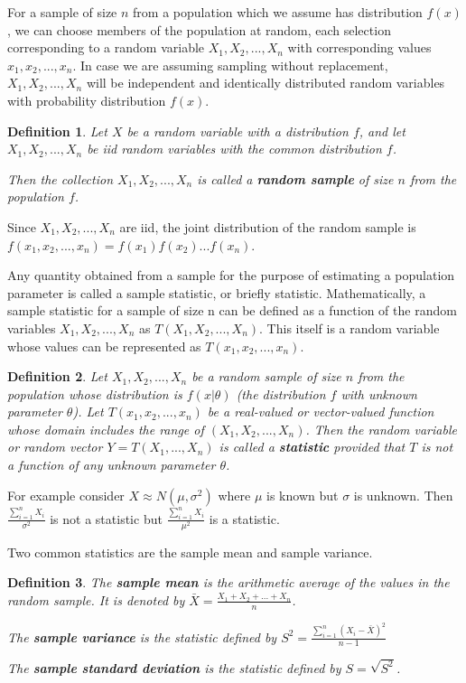 \documentclass[12pt,twoside]{report}
\theoremstyle{thmstyle}
\newtheorem{defn}{Definition}
\begin{document}
For a sample of size $n$ from a population which we assume has distribution $f(x)$, we can choose members of the population at random, each selection corresponding to a random variable $X_1, X_2, ..., X_n$ with corresponding values $x_1, x_2, ..., x_n$. In case we are assuming sampling without replacement, $X_1, X_2, ..., X_n$ will be independent and identically distributed random variables with probability distribution $f(x)$.

\begin{defn}
Let $X$ be a random variable with a distribution $f$, and let $X_1, X_2, ..., X_n$ be iid random variables with the common distribution $f$.

Then the collection $X_1, X_2, ..., X_n$ is called a \textbf{random sample} of size $n$ from the population $f$.
\end{defn}

Since $X_1, X_2, ..., X_n$ are iid, the joint distribution of the random sample is \\
$f(x_1, x_2, ..., x_n) = f(x_1) f(x_2) ... f(x_n)$.

Any quantity obtained from a sample for the purpose of estimating a population parameter is called a sample
statistic, or briefly statistic. Mathematically, a sample statistic for a sample of size n can be defined as a function of the random variables $X_1, X_2, ..., X_n$ as $T(X_1, X_2, ..., X_n)$. This itself is a random variable whose values can be represented as $T(x_1, x_2, ..., x_n)$.

\begin{defn}
    Let $X_1, X_2, ..., X_n$ be a random sample of size $n$ from the population whose distribution is $f\left (x|\theta\right )$ (the distribution $f$ with unknown parameter $\theta$). Let $T\left (x_1, x_2, ...,x_n\right )$ be a real-valued or vector-valued function whose domain includes the range of $\left (X_1, X_2, ..., X_n\right )$. Then the random variable or random vector $Y = T\left (X_1, ..., X_n\right )$ is called a \textbf{statistic} provided that $T$ is not a function of any unknown parameter $\theta$.
\end{defn}

For example consider $X \approx N(\mu, \sigma^2)$ where $\mu$ is known but $\sigma$ is unknown. Then $\frac{\sum_{i=1}^n X_i}{\sigma^2}$ is not a statistic but $\frac{\sum_{i=1}^n X_i}{\mu^2}$ is a statistic.

Two common statistics are the sample mean and sample variance.

\begin{defn}
    The \textbf{sample mean} is the arithmetic average of the values in the random sample. It is denoted by $\bar{X} = \displaystyle \frac{X_1 + X_2 + ... + X_n}{n}$.

    The \textbf{sample variance} is the statistic defined by $S^2 = \displaystyle \frac{\sum_{i=1}^n \left (X_i - \bar{X}\right )^2}{n-1}$

    The \textbf{sample standard deviation} is the statistic defined by $S = \sqrt{S^2}$.
\end{defn}
\end{document}
